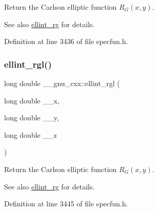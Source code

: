 Return the Carlson elliptic function $ R_G(x,y) $.

\begin{DoxySeeAlso}{See also}
\hyperlink{group__gnu__math__spec__func_gadf618529d6106c1c1bc1e9212c4fed12}{ellint\+\_\+rg} for details. 
\end{DoxySeeAlso}


Definition at line 3436 of file specfun.\+h.

\mbox{\label{group__gnu__math__spec__func_ga563455d515ed845988552432108a21be}} 
\subsubsection{\texorpdfstring{ellint\+\_\+rgl()}{ellint\_rgl()}}
{\footnotesize\ttfamily long double \+\_\+\+\_\+gnu\+\_\+cxx\+::ellint\+\_\+rgl (\begin{DoxyParamCaption}\item[{long double}]{\+\_\+\+\_\+x,  }\item[{long double}]{\+\_\+\+\_\+y,  }\item[{long double}]{\+\_\+\+\_\+z }\end{DoxyParamCaption})\hspace{0.3cm}{\ttfamily [inline]}}

Return the Carlson elliptic function $ R_G(x,y) $.

\begin{DoxySeeAlso}{See also}
\hyperlink{group__gnu__math__spec__func_gadf618529d6106c1c1bc1e9212c4fed12}{ellint\+\_\+rg} for details. 
\end{DoxySeeAlso}


Definition at line 3445 of file specfun.\+h.

\mbox{\label{group__gnu__math__spec__func_gadccabc8df929cc03745286ed1574a3ba}} 
